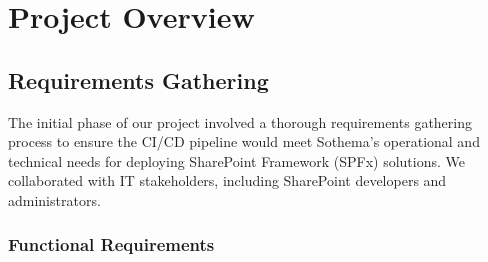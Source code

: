 \chapter{Project Overview}
\label{chapter:ProjectOverview}

\section{Requirements Gathering}
\label{sec:RequirementsGathering}

The initial phase of our project involved a thorough requirements gathering process to ensure the CI/CD pipeline would meet Sothema's operational and technical needs for deploying SharePoint Framework (SPFx) solutions. We collaborated with IT stakeholders, including SharePoint developers and administrators.

\subsection{Functional Requirements}
\label{subsec:FunctionalRequirements}

